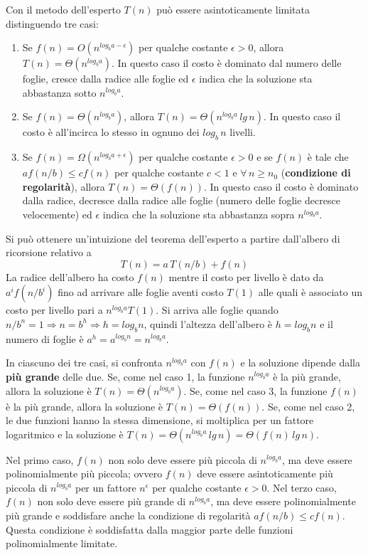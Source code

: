 \documentclass[10pt, a4paper]{report}
\begin{document}
Con il metodo dell'esperto $T(n)$ può essere asintoticamente limitata distinguendo tre casi:
\begin{enumerate}
\item Se $f(n) = O(n^{log_{b}{a} - \epsilon})$ per qualche costante $\epsilon > 0$, allora $T(n) = \Theta(n^{log_{b}{a}})$. In questo caso il costo è dominato dal numero delle foglie, cresce dalla radice alle foglie ed $\epsilon$ indica che la soluzione sta abbastanza sotto $n^{log_{b}{a}}$.
\item Se $f(n) = \Theta(n^{log_{b}{a}})$, allora $T(n) = \Theta(n^{log_{b}{a}} \,lg\,n)$. In questo caso il costo è all'incirca lo stesso in ognuno dei $log_{b}{\,n}$ livelli.
\item Se $f(n) = \Omega(n^{log_{b}{a} + \epsilon})$ per qualche costante $\epsilon > 0$ e se $f(n)$ è tale che $af(n/b) \leq cf(n)$ per qualche  costante $c < 1$ e $\forall\,n \geq n_0$ (\textbf{condizione di regolarità}), allora $T(n) = \Theta(f(n))$. In questo caso il costo è dominato dalla radice, decresce dalla radice alle foglie (numero delle foglie decresce velocemente) ed $\epsilon$ indica che la soluzione sta abbastanza sopra $n^{log_{b}{a}}$.
\end{enumerate}

Si può ottenere un'intuizione del teorema dell'esperto a partire dall'albero di ricorsione relativo a
\begin{equation*}
T(n) = a\,T(n/b) + f(n)
\end{equation*}
La radice dell'albero ha costo $f(n)$ mentre il costo per livello è dato da $a^if(n/b^i)$ fino ad arrivare alle foglie aventi costo $T(1)$ alle quali è associato un costo per livello pari a $n^{log_{b}{a}}T(1)$. Si arriva alle foglie quando $n/b^n = 1 \Rightarrow n = b^h \Rightarrow h = log_{b}{n}$, quindi l'altezza dell'albero è $h = log_{b}{n}$ e il numero di foglie è $a^h = a^{log_{b}{n}} = n^{log_{b}{a}}$.

In ciascuno dei tre casi, si confronta $n^{log_{b}{a}}$ con $f(n)$ e la soluzione dipende dalla \textbf{più grande} delle due. Se, come nel caso 1, la funzione $n^{log_{b}{a}}$ è la più grande, allora la soluzione è $T(n) = \Theta(n^{log_{b}{a}})$. Se, come nel caso 3, la funzione $f(n)$ è la più grande, allora la soluzione è $T(n) = \Theta(f(n))$. Se, come nel caso 2, le due funzioni hanno la stessa dimensione, si moltiplica per un fattore logaritmico e la soluzione è $T(n) = \Theta(n^{log_{b}{a}} \,lg\,n) = \Theta(f(n) \,lg\,n)$.

Nel primo caso, $f(n)$ non solo deve essere più piccola di $n^{log_{b}{a}}$, ma deve essere polinomialmente più piccola; ovvero $f(n)$ deve essere asintoticamente più piccola di $n^{log_{b}{a}}$ per un fattore $n^\epsilon$ per qualche costante $\epsilon > 0$. Nel terzo caso, $f(n)$ non solo deve essere più grande di $n^{log_{b}{a}}$, ma deve essere polinomialmente più grande e soddisfare anche la condizione di regolarità $af(n/b) \leq cf(n)$. Questa condizione è soddisfatta dalla maggior parte delle funzioni polinomialmente limitate.
\end{document}
